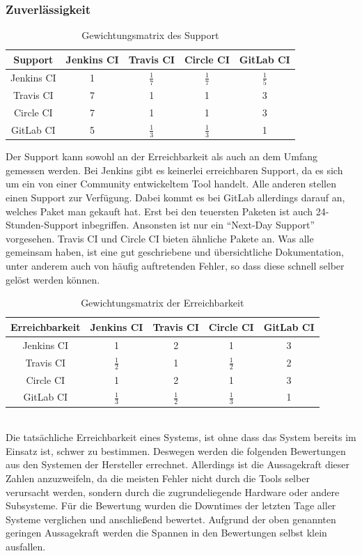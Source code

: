 \subsubsection{Zuverlässigkeit}
\begin{table}[h!]
	\centering
	\begin{tabular}{c|cccc}
		Support   & Jenkins CI		 & Travis CI& Circle CI & GitLab CI   \\ 
		\hline
		Jenkins CI      & 1     	&  $\frac{1}{7}$        &      $\frac{1}{7}$       &      $\frac{1}{5}$     \\
		Travis CI &  7    & 1         &  1  	&   3      \\
		Circle CI   &   7    &  1 & 1            & 3  \\
		GitLab CI    &    5   &  $\frac{1}{3}$   &    $\frac{1}{3}$   	& 1           \\
	\end{tabular}
	\caption{Gewichtungsmatrix des Support}
\end{table}
Der Support kann sowohl an der Erreichbarkeit als auch an dem Umfang gemessen werden. Bei Jenkins gibt es keinerlei erreichbaren Support, da es sich um ein von einer Community entwickeltem Tool handelt. Alle anderen stellen einen Support zur Verfügung. Dabei kommt es bei GitLab allerdings darauf an, welches Paket man gekauft hat. Erst bei den teuersten Paketen ist auch 24-Stunden-Support inbegriffen. Ansonsten ist nur ein \enquote{Next-Day Support} vorgesehen. Travis CI und Circle CI bieten ähnliche Pakete an. Was alle gemeinsam haben, ist eine gut geschriebene und übersichtliche Dokumentation, unter anderem auch von häufig auftretenden Fehler, so dass diese schnell selber gelöst werden können.
\begin{table}[h!]
	\centering
	\begin{tabular}{c|cccc}
		Erreichbarkeit   & Jenkins CI		 & Travis CI& Circle CI & GitLab CI   \\ 
		\hline
		Jenkins CI      & 1     		      &        2       &      1       &      3     \\
		Travis CI &   $\frac{1}{2}$     & 1               &  $\frac{1}{2}$&2      \\
		Circle CI   &   1    &  2  & 1            & 3  \\
		GitLab CI    &    $\frac{1}{3}$    &  $\frac{1}{2}$   &        $\frac{1}{3}$     & 1           \\
	\end{tabular}
	\caption{Gewichtungsmatrix der Erreichbarkeit}
\end{table}\\
Die tatsächliche Erreichbarkeit eines Systems, ist ohne dass das System bereits im Einsatz ist, schwer zu bestimmen. Deswegen werden die folgenden Bewertungen aus den Systemen der Hersteller errechnet. Allerdings ist die Aussagekraft dieser Zahlen anzuzweifeln, da die meisten Fehler nicht durch die Tools selber verursacht werden, sondern durch die zugrundeliegende Hardware oder andere Subsysteme. Für die Bewertung wurden die Downtimes der letzten Tage aller Systeme verglichen und anschließend bewertet. Aufgrund der oben genannten geringen Aussagekraft werden die Spannen in den Bewertungen selbst klein ausfallen.  
